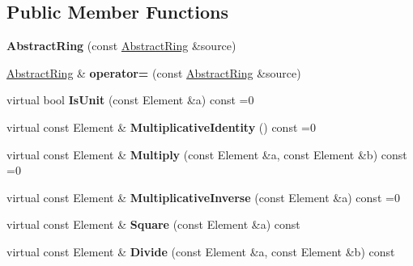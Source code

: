 \subsection*{Public Member Functions}
\begin{DoxyCompactItemize}
\item 
\hypertarget{class_abstract_ring_acc8afd5ce95e32e45d3c30a710bf36dc}{
{\bfseries AbstractRing} (const \hyperlink{class_abstract_ring}{AbstractRing} \&source)}
\label{class_abstract_ring_acc8afd5ce95e32e45d3c30a710bf36dc}

\item 
\hypertarget{class_abstract_ring_a26709c02c869d09d756653ae1129f8a9}{
\hyperlink{class_abstract_ring}{AbstractRing} \& {\bfseries operator=} (const \hyperlink{class_abstract_ring}{AbstractRing} \&source)}
\label{class_abstract_ring_a26709c02c869d09d756653ae1129f8a9}

\item 
\hypertarget{class_abstract_ring_acc7079c244d980c670c329e483c4f107}{
virtual bool {\bfseries IsUnit} (const Element \&a) const =0}
\label{class_abstract_ring_acc7079c244d980c670c329e483c4f107}

\item 
\hypertarget{class_abstract_ring_a390832165268e39e2a1f3263e5b44627}{
virtual const Element \& {\bfseries MultiplicativeIdentity} () const =0}
\label{class_abstract_ring_a390832165268e39e2a1f3263e5b44627}

\item 
\hypertarget{class_abstract_ring_a4ba8818fc72fa298cd52fd483bdd6ad4}{
virtual const Element \& {\bfseries Multiply} (const Element \&a, const Element \&b) const =0}
\label{class_abstract_ring_a4ba8818fc72fa298cd52fd483bdd6ad4}

\item 
\hypertarget{class_abstract_ring_aba109f4e7932d77a8251c1ec20627571}{
virtual const Element \& {\bfseries MultiplicativeInverse} (const Element \&a) const =0}
\label{class_abstract_ring_aba109f4e7932d77a8251c1ec20627571}

\item 
\hypertarget{class_abstract_ring_a497fedc2d0ee1da44dc9a723ebc29550}{
virtual const Element \& {\bfseries Square} (const Element \&a) const }
\label{class_abstract_ring_a497fedc2d0ee1da44dc9a723ebc29550}

\item 
\hypertarget{class_abstract_ring_a188314dfb2a316c328d9f96370b82bac}{
virtual const Element \& {\bfseries Divide} (const Element \&a, const Element \&b) const }
\label{class_abstract_ring_a188314dfb2a316c328d9f96370b82bac}


\end{DoxyCompactItemize}
